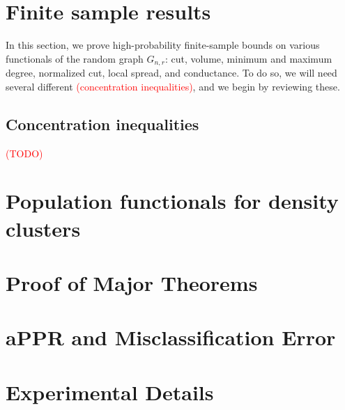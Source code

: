 \documentclass{article}
\newcommand{\1}{\mathbf{1}}
\theoremstyle{definition}
\theoremstyle{remark}
\begin{document}
\section{Finite sample results}
In this section, we prove high-probability finite-sample bounds on various functionals of the random graph $G_{n,r}$: cut, volume, minimum and maximum degree, normalized cut, local spread, and conductance. To do so, we will need several different \textcolor{red}{(concentration inequalities)}, and we begin by reviewing these.

\subsection{Concentration inequalities}
\textcolor{red}{(TODO)}

\section{Population functionals for density clusters}

\section{Proof of Major Theorems}
\label{sec:pf_major_theorems}

\section{aPPR and Misclassification Error}
\label{sec:appr_misclassification_error}

\section{Experimental Details}
\label{sec:experimental_details}

\clearpage

 
\end{document}

